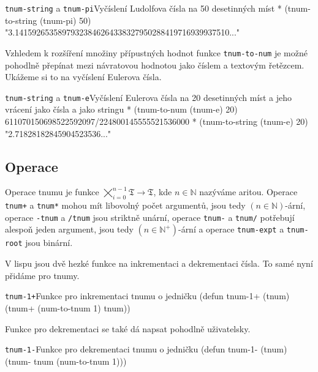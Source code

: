 \begin{lisptest}{\texttt{tnum-string} a \texttt{tnum-pi}}{Vyčíslení Ludolfova čísla na 50 desetinných míst}
* (tnum-to-string (tnum-pi) 50)
"3.14159265358979323846264338327950288419716939937510..."
\end{lisptest}

Vzhledem k rozšíření množiny přípustných hodnot funkce \texttt{tnum-to-num} je možné pohodlně přepínat mezi návratovou hodnotou jako číslem a textovým řetězcem. Ukážeme si to na vyčíslení Eulerova čísla.

\begin{lisptest}{\texttt{tnum-string} a \texttt{tnum-e}}{Vyčíslení Eulerova čísla na 20 desetinných míst a jeho vrácení jako čísla a jako stringu}
* (tnum-to-num (tnum-e) 20)
611070150698522592097/224800145555521536000
* (tnum-to-string (tnum-e) 20)
"2.71828182845904523536..."
\end{lisptest}

\subsection{Operace}
Operace tnumu je funkce $\bigtimes_{i=0}^{n-1}\mathfrak{T}\rightarrow\mathfrak{T}$, kde $n\in\mathbb{N}$ nazýváme aritou. Operace \texttt{tnum+} a \texttt{tnum*} mohou mít libovolný počet argumentů, jsou tedy $(n \in \mathbb{N})$-ární, operace \texttt{-tnum} a \texttt{/tnum} jsou striktně unární, operace \texttt{tnum-} a \texttt{tnum/} potřebují alespoň jeden argument, jsou tedy $(n \in \mathbb{N}^+)$-ární a operace \texttt{tnum-expt} a \texttt{tnum-root} jsou binární.

V lispu jsou dvě hezké funkce na inkrementaci a dekrementaci čísla. To samé nyní přidáme pro tnumy.

\begin{lispcode}{\texttt{tnum-1+}}{Funkce pro inkrementaci tnumu o jedničku}
(\textcolor{funkcionalni}{defun} \textcolor{pojmenovan}{tnum-1+} (tnum)
  (\textcolor{moje}{tnum+} (\textcolor{moje}{num-to-tnum} 1) tnum))
\end{lispcode}

Funkce pro dekrementaci se také dá napsat pohodlně uživatelsky.

\begin{lispcode}{\texttt{tnum-1-}}{Funkce pro dekrementaci tnumu o jedničku}
(\textcolor{funkcionalni}{defun} \textcolor{pojmenovan}{tnum-1-} (tnum)
  (\textcolor{moje}{tnum-} tnum (\textcolor{moje}{num-to-tnum} 1)))
\end{lispcode}

